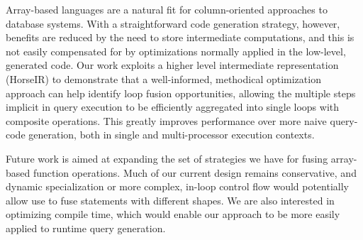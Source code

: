 Array-based languages are a natural fit for column-oriented approaches to database systems.  With a straightforward code generation strategy, however, benefits are reduced by the need to store intermediate computations, and this is not easily compensated for by optimizations normally applied in the low-level, generated code.  Our work exploits a higher level intermediate representation (HorseIR) to demonstrate that a well-informed, methodical optimization approach can help identify loop fusion opportunities, allowing the multiple steps implicit in query execution to be efficiently aggregated into single loops with composite operations.  This greatly improves performance over more naive query-code generation, both in single and multi-processor execution contexts.

Future work is aimed at expanding the set of strategies we have for fusing array-based function operations.  Much of our current design remains conservative, and dynamic specialization or more complex, in-loop control flow would potentially allow use to fuse statements with different shapes.  We are also interested in optimizing compile time, which would enable our approach to be more easily applied to runtime query generation.
